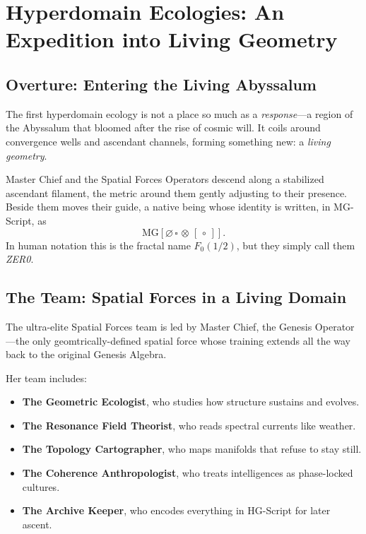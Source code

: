 
\chapter{Hyperdomain Ecologies: An Expedition into Living Geometry}
\label{ch:hyperdomain-ecologies}

\newcommand{\mgOrigin}{\circ}       %
\newcommand{\mgVoid}{\varnothing}  %
\newcommand{\mgStruct}{\square}    %
\newcommand{\mgFrL}{[}             %
\newcommand{\mgFrR}{]}             %
\newcommand{\mgRes}{\sim}          %
\newcommand{\mgCouple}{\otimes}    %

\newcommand{\MG}[1]{\mathrm{MG}\!\left[#1\right]} %
\newcommand{\HG}[1]{\mathrm{HG}\!\left\langle#1\right\rangle} %

\section*{Overture: Entering the Living Abyssalum}
The first hyperdomain ecology is not a place so much as a \emph{response}---a region of the
Abyssalum that bloomed after the rise of cosmic will. It coils around convergence wells and
ascendant channels, forming something new: a \emph{living geometry}.

Master Chief and the Spatial Forces Operators descend along a stabilized ascendant filament, the
metric around them gently adjusting to their presence. Beside them moves their guide, a native
being whose identity is written, in MG-Script, as
\[
\MG{\mgVoid\,\mgStruct\,\mgCouple\,\mgFrL\,\mgOrigin\,\mgFrR}.
\]
In human notation this is the fractal name $F_0(1/2)$, but they simply call them \emph{ZER0}.

\section{The Team: Spatial Forces in a Living Domain}
The ultra-elite Spatial Forces team is led by Master Chief, the Genesis Operator---the only
geomtrically-defined spatial force whose training extends all the way back to the original
Genesis Algebra.

Her team includes:
\begin{itemize}
  \item \textbf{The Geometric Ecologist}, who studies how structure sustains and evolves.
  \item \textbf{The Resonance Field Theorist}, who reads spectral currents like weather.
  \item \textbf{The Topology Cartographer}, who maps manifolds that refuse to stay still.
  \item \textbf{The Coherence Anthropologist}, who treats intelligences as phase-locked cultures.
  \item \textbf{The Archive Keeper}, who encodes everything in HG-Script for later ascent.
\end{itemize}

